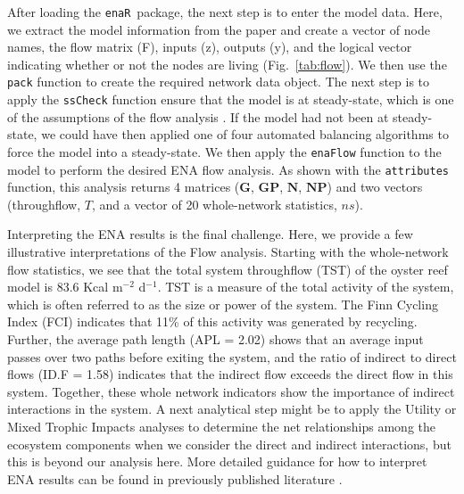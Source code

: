 \documentclass[11pt]{article}
\newcommand{\R}{R}
\newcommand{\enaR}{\texttt{enaR}}
\begin{document}
\begin{spacing}{2}
After loading the \enaR\ package, the next step is to enter the model
data.
Here, we extract the model information from the paper and
create a vector of node names, the flow matrix (F), inputs (z),
outputs (y), and the logical vector indicating whether or not the
nodes are living (Fig.~\ref{tab:flow}).  We then use the
\texttt{pack} function to create the required network data object.
The next step is to apply the \texttt{ssCheck} function ensure that
the model is at steady-state, which is one of the assumptions of the
flow analysis \citep{finn76, fath06}.  If the model had not been at
steady-state, we could have then applied one of four automated
balancing algorithms \citep[AVG, Input-Output, Output-Input,
AVG2;][]{allesina03} to force the model into a steady-state.  We then
apply the \texttt{enaFlow} function to the model to perform the
desired ENA flow analysis.  As shown with the \texttt{attributes}
function, this analysis returns 4 matrices ($\mathbf{G}$,
$\mathbf{GP}$, $\mathbf{N}$, $\mathbf{NP}$) and two vectors
(throughflow, $T$, and a vector of 20 whole-network statistics, $ns$).

Interpreting the ENA results is the final challenge.  Here, we provide
a few illustrative interpretations of the Flow analysis.  Starting
with the whole-network flow statistics, we see that the total system
throughflow (TST) of the oyster reef model is 83.6 Kcal m$^{-2}$
d$^{-1}$. TST is a measure of the total activity of the system, which
is often referred to as the size or power of the system.  The Finn
Cycling Index (FCI) indicates that 11\% of this activity was generated
by recycling.  Further, the average path length (APL = 2.02) shows
that an average input passes over two paths before exiting the system,
and the ratio of indirect to direct flows (ID.F = 1.58) indicates that
the indirect flow exceeds the direct flow in this system.  Together,
these whole network indicators show the importance of indirect
interactions in the system.  A next analytical step might be to apply
the Utility or Mixed Trophic Impacts analyses to determine the net
relationships among the ecosystem components when we consider the
direct and indirect interactions, but this is beyond our analysis here.
More detailed guidance for how to interpret ENA results can be found
in previously published literature \citep{fath06, schramski11,
  jorgensen07_newecology}.



\end{spacing}
\end{document}
